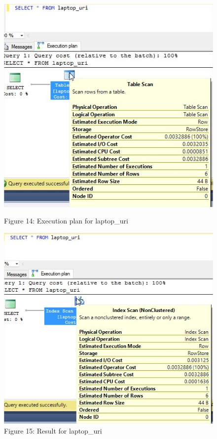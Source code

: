 \begin{figure}[H]
	\centering
		\includegraphics[width=\linewidth]{screens/19.jpg}
		\caption*{Figure 14: Execution plan for laptop\_uri}
		\label{}
	\endminipage\hfill
		\includegraphics[width=\linewidth]{screens/20.jpg}
		\caption*{Figure 15: Result for laptop\_uri}
	\endminipage
\end{figure}
\bigskip